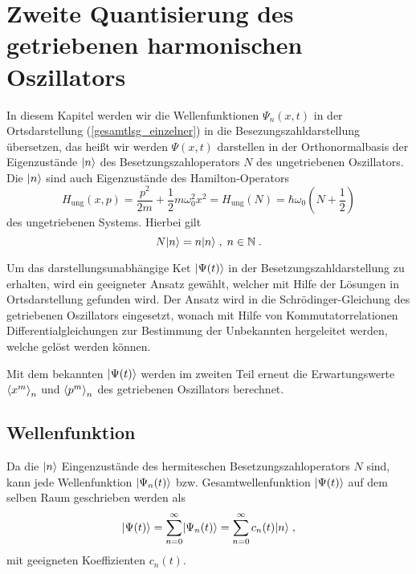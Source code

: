 \chapter{Zweite Quantisierung des getriebenen harmonischen Oszillators}
\label{5}
In diesem Kapitel werden wir die Wellenfunktionen $\Psi_n(x,t)$ in der Ortsdarstellung (\ref{gesamtlsg_einzelner}) in die Besezungszahldarstellung übersetzen, das heißt wir werden $\Psi(x,t)$ darstellen in der Orthonormalbasis der Eigenzustände $\lvert n\rangle$ des Besetzungszahloperators $N$ des ungetriebenen Oszillators.
Die $\lvert n\rangle$ sind auch Eigenzustände des Hamilton-Operators
\begin{equation}
   H_\text{ung}(x,p) = \frac{ p^2}{2m} + \frac 1 2 m\omega_0^2 x^2 = H_{\text{ung}}(N)= \hbar\omega_0\left(N+\frac 1 2\right)
\end{equation}
des ungetriebenen Systems.
Hierbei gilt
\begin{equation}
   N \lvert n\rangle = n \lvert n\rangle \;,\; n\in \mathbb{N} \;.
\end{equation}
\iffalse
\begin{equation}
  H=\frac{\hat p^2}{2m} + \frac 1 2 m\omega_0^2\hat x^2 = \hbar\eft(\hat n+\frac 1 2\right)
\end{equation}
\fi
Um das darstellungsunabhängige Ket $\lvert\Psi(t)\rangle$ in der Besetzungszahldarstellung zu erhalten, wird ein geeigneter Ansatz gewählt, welcher mit Hilfe der Lösungen in Ortsdarstellung gefunden wird.
Der Ansatz wird in die Schrödinger-Gleichung des getriebenen Oszillators eingesetzt, wonach mit Hilfe von Kommutatorrelationen Differentialgleichungen zur Bestimmung der Unbekannten hergeleitet werden, welche gelöst werden können.

Mit dem bekannten $\lvert\Psi(t)\rangle$ werden im zweiten Teil erneut die Erwartungswerte $\braket{x^m}_n$ und $\braket{p^m}_n$ des getriebenen Oszillators berechnet.


\section{Wellenfunktion}
  Da die $\lvert n\rangle$ Eingenzustände des hermiteschen Besetzungszahloperators $N$ sind, kann jede Wellenfunktion $\lvert\Psi_n(t)\rangle$ bzw. Gesamtwellenfunktion $\lvert\Psi(t)\rangle$ auf dem selben Raum geschrieben werden als
  \begin{equation}
    \lvert\Psi(t)\rangle=\sum_{n=0}^{\infty}\lvert\Psi_n(t)\rangle=\sum_{n=0}^{\infty}c_n(t)\lvert n\rangle \;,
  \end{equation}
  mit geeigneten Koeffizienten $c_n(t)$.


